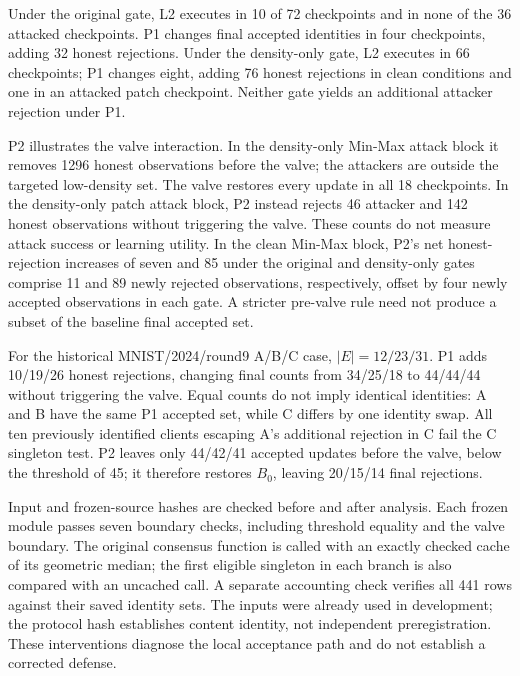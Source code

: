 \documentclass[journal]{IEEEtran}
\begin{document}
Under the original gate, L2 executes in 10 of 72 checkpoints and in none of the 36 attacked checkpoints. P1 changes final accepted identities in four checkpoints, adding 32 honest rejections. Under the density-only gate, L2 executes in 66 checkpoints; P1 changes eight, adding 76 honest rejections in clean conditions and one in an attacked patch checkpoint. Neither gate yields an additional attacker rejection under P1.

P2 illustrates the valve interaction. In the density-only Min-Max attack block it removes 1296 honest observations before the valve; the attackers are outside the targeted low-density set. The valve restores every update in all 18 checkpoints. In the density-only patch attack block, P2 instead rejects 46 attacker and 142 honest observations without triggering the valve. These counts do not measure attack success or learning utility. In the clean Min-Max block, P2's net honest-rejection increases of seven and 85 under the original and density-only gates comprise 11 and 89 newly rejected observations, respectively, offset by four newly accepted observations in each gate. A stricter pre-valve rule need not produce a subset of the baseline final accepted set.

For the historical MNIST/2024/round9 A/B/C case, $|E|=12/23/31$. P1 adds 10/19/26 honest rejections, changing final counts from 34/25/18 to 44/44/44 without triggering the valve. Equal counts do not imply identical identities: A and B have the same P1 accepted set, while C differs by one identity swap. All ten previously identified clients escaping A's additional rejection in C fail the C singleton test. P2 leaves only 44/42/41 accepted updates before the valve, below the threshold of 45; it therefore restores $B_0$, leaving 20/15/14 final rejections.

Input and frozen-source hashes are checked before and after analysis. Each frozen module passes seven boundary checks, including threshold equality and the valve boundary. The original consensus function is called with an exactly checked cache of its geometric median; the first eligible singleton in each branch is also compared with an uncached call. A separate accounting check verifies all 441 rows against their saved identity sets. The inputs were already used in development; the protocol hash establishes content identity, not independent preregistration. These interventions diagnose the local acceptance path and do not establish a corrected defense.
\end{document}
